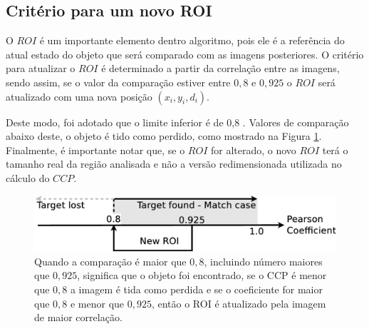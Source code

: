 \subsection{Critério para um novo ROI}

O $ROI$ é um importante elemento dentro algoritmo, pois ele é a referência do
atual estado do objeto que será comparado com as imagens posteriores.
O critério para atualizar o $ROI$ é determinado a partir da correlação 
entre as imagens, sendo assim, se o valor da comparação estiver entre $0,8$ 
e $0,925$ o $ROI$ será atualizado com uma nova posição $(x_i,y_i,d_i)$.

Deste modo, foi adotado que o limite inferior é de 0,8 \cite{Eugene}. Valores
de comparação abaixo deste, o objeto é tido como perdido, como mostrado na Figura
\ref{fig:newroicri}.
Finalmente, é importante notar que, se o $ROI$ for alterado, o novo $ROI$ terá 
o tamanho real da região analisada e não a versão redimensionada utilizada no cálculo do $CCP$.


\begin{figure}[H]
\includegraphics[width=\columnwidth]{images/figure3.eps}
\caption{Quando a comparação é maior que $0,8$, incluindo número maiores que $0,925$, significa que o objeto foi encontrado,
se o CCP é menor que $0,8$ a imagem é tida como perdida e se o coeficiente for maior que $0,8$ e menor que $0,925$, então o ROI é atualizado pela imagem de 
maior correlação.}
\label{fig:newroicri}
\end{figure}

